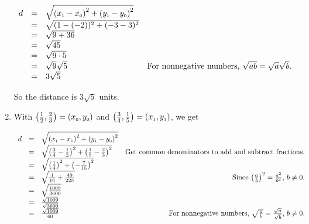 \begin{ex}
\begin{enumerate}
\setlength{\extrarowheight}{3pt}

\[ \begin{array}{rclr}

 d & = & \sqrt{\left(x_{\mbox{\tiny$1$}} - x_{\mbox{\tiny$0$}} \right)^2 + \left(y_{\mbox{\tiny$1$}} - y_{\mbox{\tiny$0$}} \right)^2} & \\
   & = & \sqrt{ (1-(-2))^2 + (-3-3)^2} & \\
   & = & \sqrt{9 + 36} & \\
   & = & \sqrt{45} & \\
   & = & \sqrt{9 \cdot 5} & \\
   & = & \sqrt{9} \sqrt{5} & \text{For nonnegative numbers, $\sqrt{ab} = \sqrt{a} \sqrt{b}$.} \\
   & = & 3 \sqrt{5} &  \end{array} \]

\setlength{\extrarowheight}{2pt}

\medskip

So the distance is $3 \sqrt{5}$ units.

\item With $\left( \frac{1}{2}, \frac{2}{3}\right) =  \left(x_{\mbox{\tiny$0$}}, y_{\mbox{\tiny$0$}}\right)$ and  $\left( \frac{3}{4}, \frac{1}{5}\right) = \left(x_{\mbox{\tiny$1$}}, y_{\mbox{\tiny$1$}}\right)$, we get

\setlength{\extrarowheight}{3pt}

\[ \begin{array}{rclr}

 d & = & \sqrt{\left(x_{\mbox{\tiny$1$}} - x_{\mbox{\tiny$0$}} \right)^2 + \left(y_{\mbox{\tiny$1$}} - y_{\mbox{\tiny$0$}} \right)^2} & \\
   & = & \sqrt{ \left(\frac{3}{4}-\frac{1}{2} \right)^2 + \left(\frac{1}{5} - \frac{2}{3} \right)^2} &  \text{Get common denominators to add and subtract fractions.}\\
   & = & \sqrt{\left(\frac{1}{4} \right)^2 + \left(-\frac{7}{15} \right)^2} &\\
   & = & \sqrt{\frac{1}{16} + \frac{49}{225}} &  \text{ Since $\left(\frac{a}{b}\right)^2 = \frac{a^2}{b^2}$, $b \neq 0$.}\\
   & = & \sqrt{\frac{1009}{3600}} & \\
   & = & \frac{\sqrt{1009}}{\sqrt{3600}} &  \\
   & = & \frac{\sqrt{1009}}{60} & \text{For nonnegative numbers, $\sqrt{\frac{a}{b}} = \frac{\sqrt{a}}{\sqrt{b}}$, $b \neq 0$.} \end{array} \]


\end{enumerate}
\end{ex}
